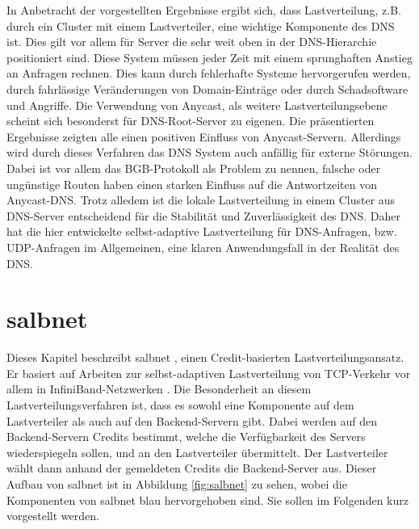 \documentclass[a4paper, 12pt, BCOR10mm, DIV12, toc=bibliography, toc=listof, german]{scrbook}
\begin{document}
	In Anbetracht der vorgestellten Ergebnisse ergibt sich, dass Lastverteilung, z.B. durch ein
	Cluster mit einem Lastverteiler, eine wichtige Komponente des DNS ist. Dies gilt vor allem für Server die
	sehr weit oben in der DNS-Hierarchie positioniert sind. Diese System müssen jeder Zeit mit einem
	sprunghaften Anstieg an Anfragen rechnen. Dies kann durch fehlerhafte Systeme hervorgerufen werden,
	durch fahrlässige Veränderungen von Domain-Einträge oder durch Schadsoftware und Angriffe. Die
	Verwendung von Anycast, als weitere Lastverteilungsebene scheint sich besonderst für
	DNS-Root-Server zu eigenen. Die präsentierten Ergebnisse zeigten alle einen positiven Einfluss von
	Anycast-Servern. Allerdings wird durch dieses Verfahren das DNS System auch anfällig für externe
	Störungen. Dabei ist vor allem das BGB-Protokoll als Problem zu nennen, falsche oder ungünstige
	Routen haben einen starken Einfluss auf die Antwortzeiten von Anycast-DNS. Trotz alledem ist die lokale
	Lastverteilung in einem Cluster aus DNS-Server entscheidend für die Stabilität und Zuverlässigkeit
	des DNS. Daher hat die hier entwickelte selbst-adaptive Lastverteilung für DNS-Anfragen, bzw.
	UDP-Anfragen im Allgemeinen, eine klaren Anwendungsfall in der Realität des DNS.


	\chapter{salbnet} %
	\label{cha:salbnet}

		Dieses Kapitel beschreibt salbnet \cite{salbnet}, einen Credit-basierten
		Lastverteilungsansatz.  Er basiert auf Arbeiten zur selbst-adaptiven Lastverteilung von
		TCP-Verkehr vor allem in InfiniBand-Netzwerken \cite{zinke2007, scsczile2008,
		schneidenbach2009}. Die Besonderheit an diesem Lastverteilungsverfahren ist, dass es sowohl eine
		Komponente auf dem Lastverteiler als auch auf den Backend-Servern gibt. Dabei werden auf den
		Backend-Servern Credits bestimmt, welche die Verfügbarkeit des Servers wiederspiegeln sollen,
		und an den Lastverteiler übermittelt. Der Lastverteiler wählt dann anhand der gemeldeten
		Credits die Backend-Server aus. Dieser Aufbau von salbnet ist in Abbildung \ref{fig:salbnet} zu
		sehen, wobei die Komponenten von salbnet blau hervorgehoben sind. Sie sollen im Folgenden kurz
		vorgestellt werden.
\end{document}
